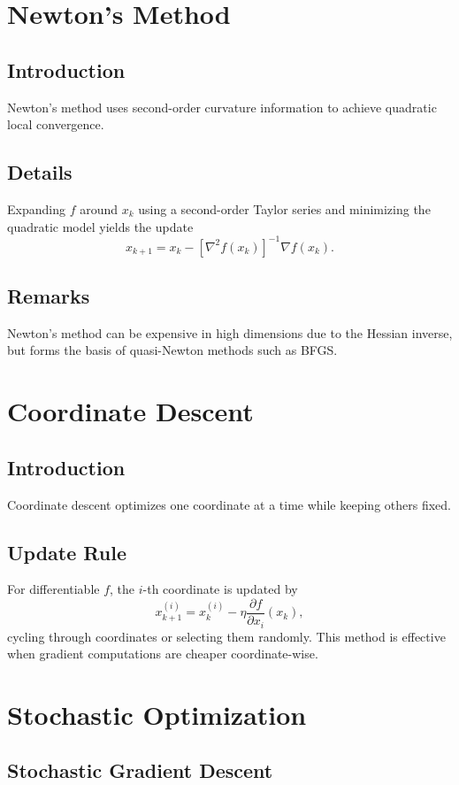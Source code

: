 \documentclass[11pt]{book}
\begin{document}
\section{Newton's Method}
\subsection{Introduction}
Newton's method uses second-order curvature information to achieve quadratic local convergence.
\subsection{Details}
Expanding $f$ around $x_k$ using a second-order Taylor series and minimizing the quadratic model yields the update
\begin{equation}
x_{k+1}=x_k-\left[\nabla^2 f(x_k)\right]^{-1}\nabla f(x_k).
\end{equation}
\subsection{Remarks}
Newton's method can be expensive in high dimensions due to the Hessian inverse, but forms the basis of quasi-Newton methods such as BFGS.

\section{Coordinate Descent}
\subsection{Introduction}
Coordinate descent optimizes one coordinate at a time while keeping others fixed.
\subsection{Update Rule}
For differentiable $f$, the $i$-th coordinate is updated by
\begin{equation}
x_{k+1}^{(i)} = x_k^{(i)} - \eta \frac{\partial f}{\partial x_i}(x_k),
\end{equation}
cycling through coordinates or selecting them randomly. This method is effective when gradient computations are cheaper coordinate-wise.

\section{Stochastic Optimization}
\subsection{Stochastic Gradient Descent}
\end{document}
